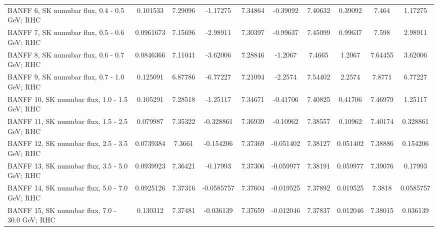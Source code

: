 \begin{tabular}{| l | S | S  S | S  S | S  S | S  S | }
                                   BANFF  6, SK numubar flux, 0.4 - 0.5 GeV; RHC &        0.101533 &         7.29096 &        -1.17275 &         7.34864 &        -0.39092 &         7.40632 &         0.39092 &           7.464 &         1.17275 \\ 
                                   BANFF  7, SK numubar flux, 0.5 - 0.6 GeV; RHC &       0.0961673 &         7.15696 &        -2.98911 &         7.30397 &        -0.99637 &         7.45099 &         0.99637 &           7.598 &         2.98911 \\ 
                                   BANFF  8, SK numubar flux, 0.6 - 0.7 GeV; RHC &       0.0846366 &         7.11041 &        -3.62006 &         7.28846 &         -1.2067 &          7.4665 &          1.2067 &         7.64455 &         3.62006 \\ 
                                   BANFF  9, SK numubar flux, 0.7 - 1.0 GeV; RHC &        0.125091 &         6.87786 &        -6.77227 &         7.21094 &         -2.2574 &         7.54402 &          2.2574 &          7.8771 &         6.77227 \\ 
                                   BANFF 10, SK numubar flux, 1.0 - 1.5 GeV; RHC &        0.105291 &         7.28518 &        -1.25117 &         7.34671 &        -0.41706 &         7.40825 &         0.41706 &         7.46979 &         1.25117 \\ 
                                   BANFF 11, SK numubar flux, 1.5 - 2.5 GeV; RHC &        0.079987 &         7.35322 &       -0.328861 &         7.36939 &        -0.10962 &         7.38557 &         0.10962 &         7.40174 &        0.328861 \\ 
                                   BANFF 12, SK numubar flux, 2.5 - 3.5 GeV; RHC &       0.0739384 &          7.3661 &       -0.154206 &         7.37369 &       -0.051402 &         7.38127 &        0.051402 &         7.38886 &        0.154206 \\ 
                                   BANFF 13, SK numubar flux, 3.5 - 5.0 GeV; RHC &       0.0939923 &         7.36421 &        -0.17993 &         7.37306 &       -0.059977 &         7.38191 &        0.059977 &         7.39076 &         0.17993 \\ 
                                   BANFF 14, SK numubar flux, 5.0 - 7.0 GeV; RHC &       0.0925126 &         7.37316 &      -0.0585757 &         7.37604 &       -0.019525 &         7.37892 &        0.019525 &          7.3818 &       0.0585757 \\ 
                                  BANFF 15, SK numubar flux, 7.0 - 30.0 GeV; RHC &        0.130312 &         7.37481 &       -0.036139 &         7.37659 &       -0.012046 &         7.37837 &        0.012046 &         7.38015 &        0.036139 \\ 

\end{tabular}
